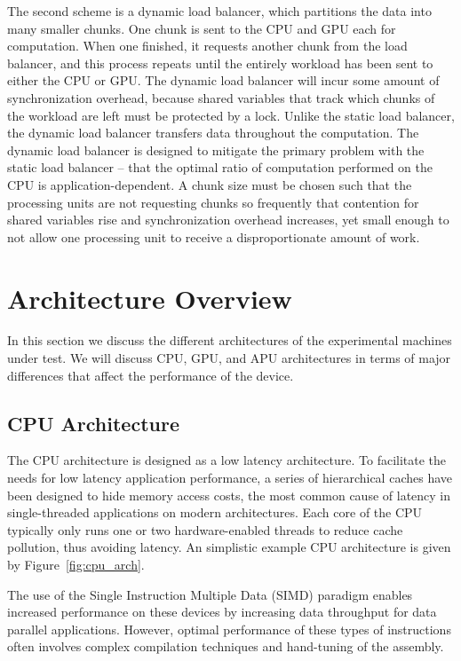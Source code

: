 \documentclass[journal]{IEEEtran}
\begin{document}
The second scheme is a dynamic load balancer, which partitions the data into many smaller
chunks.  One chunk is sent to the CPU and GPU each for computation.  When one finished,
it requests another chunk from the load balancer, and this process repeats until the
entirely workload has been sent to either the CPU or GPU.  The dynamic load balancer
will incur some amount of synchronization overhead, because shared variables that track
which chunks of the workload are left must be protected by a lock.  Unlike the static
load balancer, the dynamic load balancer transfers data throughout the computation.
The dynamic load balancer is designed to mitigate the primary problem with the static
load balancer -- that the optimal ratio of computation performed on the CPU is
application-dependent.  A chunk size must be chosen such that the processing units are
not requesting chunks so frequently that contention for shared variables rise and
synchronization overhead increases, yet small enough to not allow one processing unit
to receive a disproportionate amount of work.

\section{Architecture Overview}
In this section we discuss the different architectures of the experimental
machines under test.  We will discuss CPU, GPU, and APU architectures in
terms of major differences that affect the performance of the device.  

\subsection{CPU Architecture}
The CPU architecture is designed as a low latency architecture.  To facilitate
the needs for low latency application performance, a series of hierarchical 
caches have been designed to hide memory access costs, the most common cause
of latency in single-threaded applications on modern architectures.  Each core
of the CPU typically only runs one or two hardware-enabled threads to reduce
cache pollution, thus avoiding latency.  An simplistic example CPU architecture is given
by Figure~\ref{fig:cpu_arch}.

The use of the Single Instruction Multiple Data (SIMD) paradigm enables increased
performance on these devices by increasing data throughput for data parallel
applications.  However, optimal performance of these types of instructions often
involves complex compilation techniques and hand-tuning of the assembly.
\end{document}
